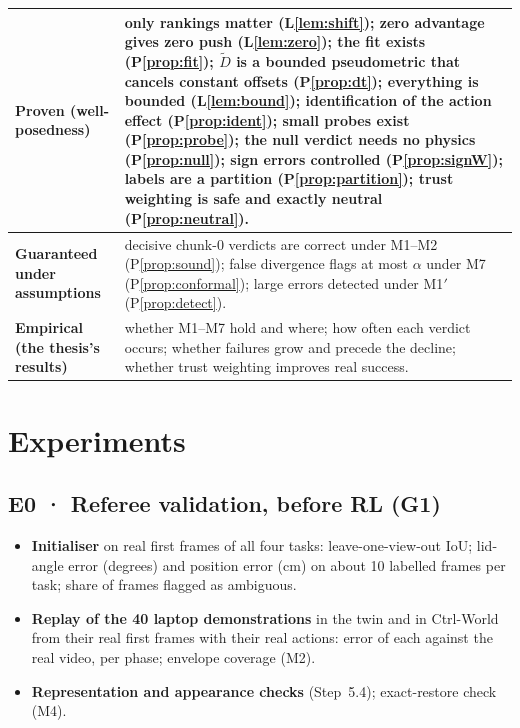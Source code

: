 \documentclass[11pt,a4paper]{article}
\theoremstyle{plain}
\theoremstyle{definition}
\theoremstyle{remark}
\newcommand{\Dt}{\tilde D}
\begin{document}
\begin{center}\small
\begin{tabularx}{\linewidth}{@{}>{\raggedright\arraybackslash}p{4.2cm}>{\raggedright\arraybackslash}X@{}}
\toprule
\textbf{Proven (well-posedness)} & only rankings matter (L\ref{lem:shift}); zero advantage gives zero push (L\ref{lem:zero}); the fit exists (P\ref{prop:fit}); $\Dt$ is a bounded pseudometric that cancels constant offsets (P\ref{prop:dt}); everything is bounded (L\ref{lem:bound}); identification of the action effect (P\ref{prop:ident}); small probes exist (P\ref{prop:probe}); the null verdict needs no physics (P\ref{prop:null}); sign errors controlled (P\ref{prop:signW}); labels are a partition (P\ref{prop:partition}); trust weighting is safe and exactly neutral (P\ref{prop:neutral}).\\
\midrule
\textbf{Guaranteed under assumptions} & decisive chunk-0 verdicts are correct under M1--M2 (P\ref{prop:sound}); false divergence flags at most $\alpha$ under M7 (P\ref{prop:conformal}); large errors detected under M1$'$ (P\ref{prop:detect}).\\
\midrule
\textbf{Empirical (the thesis's results)} & whether M1--M7 hold and where; how often each verdict occurs; whether failures grow and precede the decline; whether trust weighting improves real success.\\
\bottomrule
\end{tabularx}
\end{center}

\section{Experiments}\label{sec:experiments}

\subsection{E0 · Referee validation, before RL (G1)}
\begin{itemize}
\item \textbf{Initialiser} on real first frames of all four tasks: leave-one-view-out IoU; lid-angle error (degrees) and position error (cm) on about 10 labelled frames per task; share of frames flagged as ambiguous.
\item \textbf{Replay of the 40 laptop demonstrations} in the twin and in Ctrl-World from their real first frames with their real actions: error of each against the real video, per phase; envelope coverage (M2).
\item \textbf{Representation and appearance checks} (Step~5.4); exact-restore check (M4).
\end{itemize}
\end{document}
